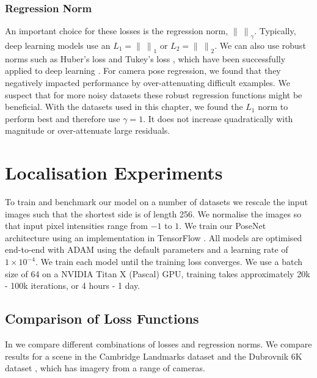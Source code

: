 \subsubsection{Regression Norm}
\label{sec:norm}

An important choice for these losses is the regression norm, $\left\lVert~\right\rVert_\gamma$. Typically, deep learning models use an $L_1 = \left\lVert~\right\rVert_1$ or $L_2 = \left\lVert~\right\rVert_2$. We can also use robust norms such as Huber's loss \citep{huber2011robust} and Tukey's loss \citep{hoaglin1983understanding}, which have been successfully applied to deep learning \citep{belagiannis2015robust}. For camera pose regression, we found that they negatively impacted performance by over-attenuating difficult examples. We suspect that for more noisy datasets these robust regression functions might be beneficial. With the datasets used in this chapter, we found the $L_1$ norm to perform best and therefore use $\gamma=1$. It does not increase quadratically with magnitude or over-attenuate large residuals.

\section{Localisation Experiments}
\label{sec:exp}

To train and benchmark our model on a number of datasets we rescale the input images such that the shortest side is of length 256. We normalise the images so that input pixel intensities range from $-1$ to $1$. We train our PoseNet architecture using an implementation in TensorFlow \citep{abadi2016tensorflow}. All models are optimised end-to-end with ADAM \citep{kingma2014adam} using the default parameters and a learning rate of $1 \times 10^{-4}$. We train each model until the training loss converges. We use a batch size of 64 on a NVIDIA Titan X (Pascal) GPU, training takes approximately 20k - 100k iterations, or 4 hours - 1 day.

\subsection{Comparison of Loss Functions}
\label{sec:loss_exp}

In  we compare different combinations of losses and regression norms. We compare results for a scene in the Cambridge Landmarks dataset \citep{kendall2015posenet} and the Dubrovnik 6K dataset \citep{li2012worldwide}, which has imagery from a range of cameras.

